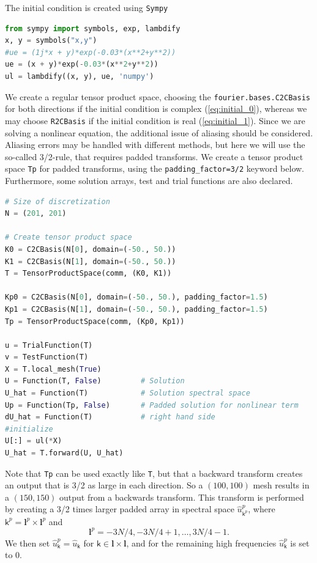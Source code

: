 \documentclass[%
oneside,                 %
final,                   %
10pt]{article}
\theoremstyle{definition}
\begin{document}
The initial condition is created using \texttt{Sympy}
\begin{lstlisting}[language=Python,style=yellow2_fb]
from sympy import symbols, exp, lambdify
x, y = symbols("x,y")
#ue = (1j*x + y)*exp(-0.03*(x**2+y**2))
ue = (x + y)*exp(-0.03*(x**2+y**2))
ul = lambdify((x, y), ue, 'numpy')
\end{lstlisting}
We create a regular tensor product space, choosing the \texttt{fourier.bases.C2CBasis} for both directions if the initial condition is complex (\ref{eq:initial_0}), whereas we may choose \texttt{R2CBasis} if the initial condition is real (\ref{eq:initial_1}). Since we are solving a nonlinear equation, the additional issue of aliasing should be considered. Aliasing errors may be handled with different methods, but here we will use the so-called 3/2-rule, that requires padded transforms. We create a tensor product space \texttt{Tp} for padded transforms, using the \Verb!padding_factor=3/2! keyword below. Furthermore, some solution arrays, test and trial functions are also declared.
\begin{lstlisting}[language=Python,style=yellow2_fb]
# Size of discretization
N = (201, 201)

# Create tensor product space
K0 = C2CBasis(N[0], domain=(-50., 50.))
K1 = C2CBasis(N[1], domain=(-50., 50.))
T = TensorProductSpace(comm, (K0, K1))

Kp0 = C2CBasis(N[0], domain=(-50., 50.), padding_factor=1.5)
Kp1 = C2CBasis(N[1], domain=(-50., 50.), padding_factor=1.5)
Tp = TensorProductSpace(comm, (Kp0, Kp1))

u = TrialFunction(T)
v = TestFunction(T)
X = T.local_mesh(True)
U = Function(T, False)         # Solution
U_hat = Function(T)            # Solution spectral space
Up = Function(Tp, False)       # Padded solution for nonlinear term
dU_hat = Function(T)           # right hand side
#initialize
U[:] = ul(*X)
U_hat = T.forward(U, U_hat)
\end{lstlisting}
Note that \texttt{Tp} can be used exactly like \texttt{T}, but that a backward transform creates an output that is 3/2 as large in each direction. So a $(100, 100)$ mesh results in a $(150, 150)$ output from a backwards transform. This transform is performed by creating a 3/2 times larger padded array in spectral space $\hat{u}^p_{\textsf{k}^p}$, where $\textsf{k}^p = \boldsymbol{l}^p \times \boldsymbol{l}^p $ and
\begin{equation}
\boldsymbol{l}^{p} = -3N/4, -3N/4+1, \ldots, 3N/4-1.
\end{equation}
We then set $\hat{u}^p_{\textsf{k}} = \hat{u}_{\textsf{k}}$ for $\textsf{k} \in \boldsymbol{l} \times \boldsymbol{l}$, and for the remaining high frequencies $\hat{u}^p_{\textsf{k}}$ is set to 0.
\end{document}

